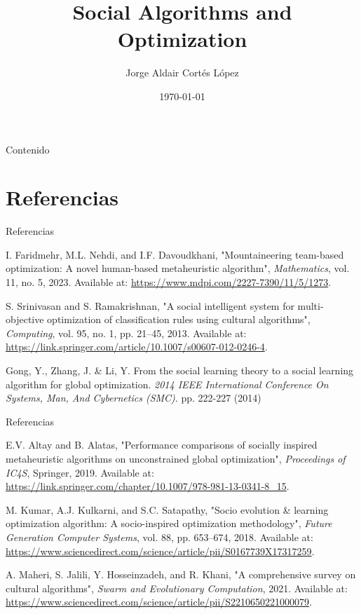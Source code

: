 \documentclass{beamer}
\title{Social Algorithms and Optimization}
\author{Jorge Aldair Cortés López}
\institute{Centro de Investigación en Computación}
\date{\today}
\begin{document}
\begin{frame}
    \titlepage
\end{frame}

\begin{frame}{Contenido}
    \tableofcontents
\end{frame}

\section{Referencias}

\begin{frame}{Referencias}
\begin{thebibliography}{30}
I. Faridmehr, M.L. Nehdi, and I.F. Davoudkhani,
"Mountaineering team-based optimization: A novel human-based metaheuristic algorithm",
\textit{Mathematics}, vol. 11, no. 5, 2023.
Available at: \url{https://www.mdpi.com/2227-7390/11/5/1273}.

S. Srinivasan and S. Ramakrishnan,
"A social intelligent system for multi-objective optimization of classification rules using cultural algorithms",
\textit{Computing}, vol. 95, no. 1, pp. 21–45, 2013. 
Available at: \url{https://link.springer.com/article/10.1007/s00607-012-0246-4}.

Gong, Y., Zhang, J. \& Li, Y. From the social learning theory to a social learning algorithm for global optimization. {\em 2014 IEEE International Conference On Systems, Man, And Cybernetics (SMC)}. pp. 222-227 (2014)

\end{thebibliography}
\end{frame}

\begin{frame}{Referencias}
\begin{thebibliography}{30}
E.V. Altay and B. Alatas,
"Performance comparisons of socially inspired metaheuristic algorithms on unconstrained global optimization",
\textit{Proceedings of IC4S}, Springer, 2019. 
Available at: \url{https://link.springer.com/chapter/10.1007/978-981-13-0341-8_15}.

M. Kumar, A.J. Kulkarni, and S.C. Satapathy,
"Socio evolution \& learning optimization algorithm: A socio-inspired optimization methodology",
\textit{Future Generation Computer Systems}, vol. 88, pp. 653–674, 2018.
Available at: \url{https://www.sciencedirect.com/science/article/pii/S0167739X17317259}.

A. Maheri, S. Jalili, Y. Hosseinzadeh, and R. Khani,
"A comprehensive survey on cultural algorithms",
\textit{Swarm and Evolutionary Computation}, 2021. 
Available at: \url{https://www.sciencedirect.com/science/article/pii/S2210650221000079}.

\end{thebibliography}
\end{frame}
\end{document}

